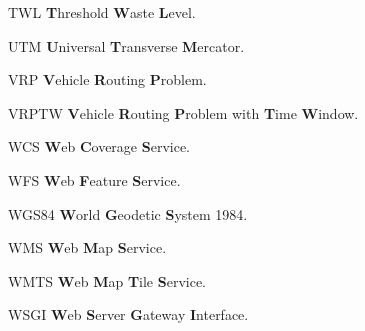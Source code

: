 \begin{abbreviations}
    \item[TWL] \textbf{T}hreshold \textbf{W}aste \textbf{L}evel.
    \item[UTM] \textbf{U}niversal \textbf{T}ransverse \textbf{M}ercator.
    \item[VRP] \textbf{V}ehicle \textbf{R}outing \textbf{P}roblem.
    \item[VRPTW] \textbf{V}ehicle \textbf{R}outing \textbf{P}roblem with \textbf{T}ime \textbf{W}indow.
    \item[WCS] \textbf{W}eb \textbf{C}overage \textbf{S}ervice.
    \item[WFS] \textbf{W}eb \textbf{F}eature \textbf{S}ervice.
    \item[WGS84] \textbf{W}orld \textbf{G}eodetic \textbf{S}ystem 1984.
    \item[WMS] \textbf{W}eb \textbf{M}ap \textbf{S}ervice.
    \item[WMTS] \textbf{W}eb \textbf{M}ap \textbf{T}ile \textbf{S}ervice.
    \item[WSGI] \textbf{W}eb \textbf{S}erver \textbf{G}ateway \textbf{I}nterface.
\end{abbreviations}